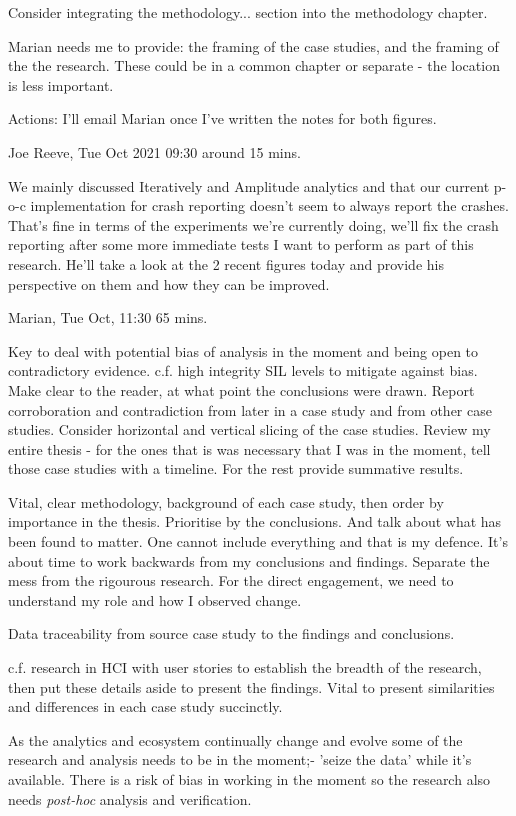 Consider integrating the methodology... section into the methodology chapter. 

Marian needs me to provide: the framing of the case studies, and the framing of the the research. These could be in a common chapter or separate - the location is less important.

Actions: I'll email Marian once I've written the notes for both figures.

\dotfill
Joe Reeve, Tue  Oct 2021 09:30 around 15 mins.

We mainly discussed Iteratively and Amplitude analytics and that our current p-o-c implementation for crash reporting doesn't seem to always report the crashes. That's fine in terms of the experiments we're currently doing, we'll fix the crash reporting after some more immediate tests I want to perform as part of this research. He'll take a look at the 2 recent figures today and provide his perspective on them and how they can be improved.

\dotfill
Marian, Tue  Oct, 11:30 65 mins.

Key to deal with potential bias of analysis in the moment and being open to contradictory evidence. c.f. high integrity SIL levels to mitigate against bias. Make clear to the reader, at what point the conclusions were drawn. Report corroboration and contradiction from later in a case study and from other case studies. Consider horizontal and vertical slicing of the case studies. Review my entire thesis - for the ones that is was necessary that I was in the moment, tell those case studies with a timeline. For the rest provide summative results. 

Vital, clear methodology, background of each case study, then order by importance in the thesis. Prioritise by the conclusions. And talk about what has been found to matter. One cannot include everything and that is my defence. It's about time to work backwards from my conclusions and findings. Separate the mess from the rigourous research. For the direct engagement, we need to understand my role and how I observed change. 

Data traceability from source case study to the findings and conclusions. 

c.f. research in HCI with user stories to establish the breadth of the research, then put these details aside to present the findings. Vital to present similarities and differences in each case study succinctly. 

As the analytics and ecosystem continually change and evolve some of the research and analysis needs to be in the moment;- 'seize the data' while it's available. There is a risk of bias in working in the moment so the research also needs \emph{post-hoc} analysis and verification. 

